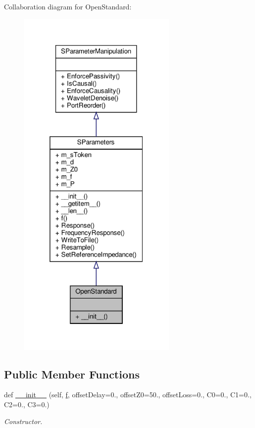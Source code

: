 Collaboration diagram for Open\+Standard\+:
\nopagebreak
\begin{figure}[H]
\begin{center}
\leavevmode
\includegraphics[width=220pt]{classSignalIntegrity_1_1Measurement_1_1CalKit_1_1Standards_1_1OpenStandard_1_1OpenStandard__coll__graph}
\end{center}
\end{figure}
\subsection*{Public Member Functions}
\begin{DoxyCompactItemize}
\item 
def \hyperlink{classSignalIntegrity_1_1Measurement_1_1CalKit_1_1Standards_1_1OpenStandard_1_1OpenStandard_aac7db212cff48729c2956c6d050e941c}{\+\_\+\+\_\+init\+\_\+\+\_\+} (self, \hyperlink{classSignalIntegrity_1_1SParameters_1_1SParameters_1_1SParameters_a32e7a34d6837fe949b413c852a0447f8}{f}, offset\+Delay=0., offset\+Z0=50., offset\+Loss=0., C0=0., C1=0., C2=0., C3=0.)
\begin{DoxyCompactList}\small\item\em Constructor. \end{DoxyCompactList}\end{DoxyCompactItemize}


